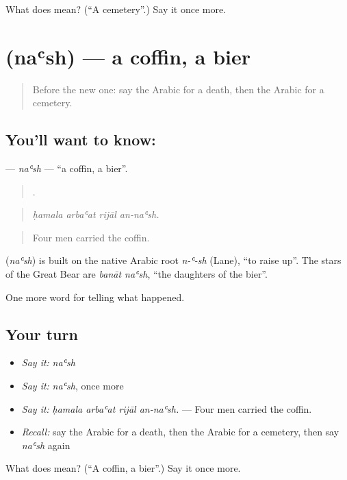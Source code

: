 \begin{tcolorbox}[breakable,colback=teal!4,colframe=teal!35!black,title={Before you move on}]
What does  mean? (\textquotedblleft{}A cemetery\textquotedblright{}.) Say it once more.
\end{tcolorbox}
\section[\texorpdfstring{\ar{نعش} (naʿsh)}{نعش (naʿsh)}]{ (naʿsh) — a coffin, a bier}

\label{lesson:AR-C338-nash}



\begin{quote}
Before the new one: say the Arabic for a death, then the Arabic for a cemetery.
\end{quote}

\subsection*{You'll want to know: }
\textbf{} — \emph{naʿsh} — \textquotedblleft{}a coffin, a bier\textquotedblright{}.

\begin{quote}
   .
\end{quote}

\begin{quote}
\emph{ḥamala arbaʿat rijāl an-naʿsh.}
\end{quote}

\begin{quote}
Four men carried the coffin.
\end{quote}

\begin{cousinweb}
\textbf{} (\emph{naʿsh}) is built on the native Arabic root \emph{n-ʿ-sh} (Lane), \textquotedblleft{}to raise up\textquotedblright{}. The stars of the Great Bear are \emph{banāt naʿsh}, \textquotedblleft{}the daughters of the bier\textquotedblright{}.
\end{cousinweb}

\begin{grammarlens}[title={What you've built}]
One more word for telling what happened.
\end{grammarlens}

\subsection*{Your turn}
\begin{itemize}
\raggedright
  \item \emph{Say it:} \emph{naʿsh}
  \item \emph{Say it:} \emph{naʿsh}, once more
  \item \emph{Say it:} \emph{ḥamala arbaʿat rijāl an-naʿsh.} — Four men carried the coffin.
  \item \emph{Recall:} say the Arabic for a death, then the Arabic for a cemetery, then say \emph{naʿsh} again
\end{itemize}

\begin{tcolorbox}[breakable,colback=teal!4,colframe=teal!35!black,title={Before you move on}]
What does  mean? (\textquotedblleft{}A coffin, a bier\textquotedblright{}.) Say it once more.
\end{tcolorbox}
